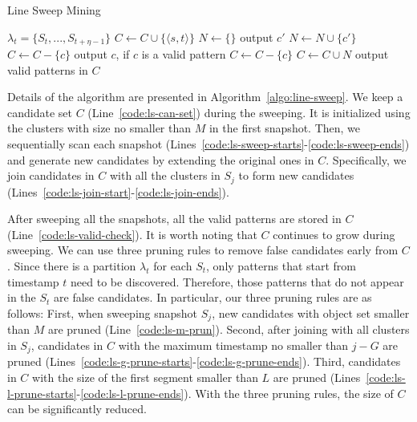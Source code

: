 \begin{algorithm}[h]
\caption{Line Sweep Mining}
\label{algo:line-sweep}
\begin{algorithmic}[1]
\Require $\lambda_t = \{S_t, ..., S_{t+\eta-1}\}$
  \label{code:ls-can-set}
\label{code:ls-init-start}
\State $C\leftarrow C\cup \{\langle s, t \rangle \}$
\EndIf
\EndFor
\label{code:ls-init-end}
 \label{code:ls-sweep-starts}
	\State $N \gets \{\}$
	 \label{code:ls-join-start}
		 \label{code:ls-join}
			\State output $c'$
			\State $N\leftarrow N\cup \{c'\}$ \label{code:ls-m-prun}	
		\EndIf
	\EndFor \label{code:ls-join-ends}
		\label{code:ls-g-prune-starts}
			\State $C\leftarrow C-\{c\}$ 
			\State output $c$, if $c$ is a valid pattern
		\EndIf  \label{code:ls-g-prune-ends}
		\label{code:ls-l-prune-starts}
			\State $C\leftarrow C-\{c\}$ 
		\EndIf\label{code:ls-l-prune-ends}
	\EndFor
	\State $C\leftarrow C\cup N$
\EndFor\label{code:ls-sweep-ends}
\State output valid patterns in  $C$  \label{code:ls-valid-check}
\end{algorithmic}
\end{algorithm}

Details of the algorithm are presented in Algorithm~\ref{algo:line-sweep}. We keep a candidate set $C$ (Line~\ref{code:ls-can-set}) during the sweeping. It is initialized using the clusters with size no smaller than $M$ in the first snapshot. Then, we sequentially scan each snapshot (Lines~\ref{code:ls-sweep-starts}-\ref{code:ls-sweep-ends}) and generate new candidates by extending the original ones in $C$.
Specifically, we join candidates in $C$ with all the clusters in $S_j$ to form new candidates (Lines~\ref{code:ls-join-start}-\ref{code:ls-join-ends}). 

After sweeping all the snapshots, all the valid patterns are stored in $C$ (Line~\ref{code:ls-valid-check}). 
It is worth noting that $C$ continues to grow during sweeping. We can use three pruning rules to remove  false candidates early from $C$. Since there is a partition $\lambda_t$ for each $S_t$, only patterns that start from timestamp $t$ need to be discovered. Therefore, those patterns that do not appear in the $S_t$ are false candidates. In particular, our
three pruning rules are as follows:
First, when sweeping snapshot $S_j$, new candidates with object set smaller than $M$ are pruned (Line~\ref{code:ls-m-prun}). Second, after joining with all clusters in $S_j$, 
candidates in $C$ with the maximum timestamp no smaller than $j-G$ are pruned (Lines~\ref{code:ls-g-prune-starts}-\ref{code:ls-g-prune-ends}). Third, candidates in $C$ with the size of the first segment smaller than $L$
are pruned (Lines~\ref{code:ls-l-prune-starts}-\ref{code:ls-l-prune-ends}).  
With the three pruning rules, the size of $C$ can be significantly reduced.  


